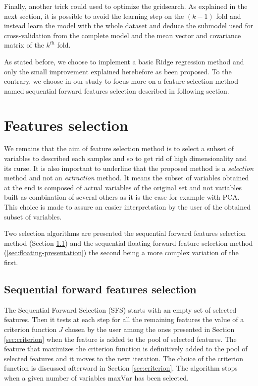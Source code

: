 \documentclass[a4paper,11pt,DIV=16]{scrartcl}
\begin{document}
    Finally, another trick could used to optimize the gridsearch. As explained in the next section, it is possible to avoid the learning step on the $(k-1)$ fold and instead learn the model with the whole dataset and deduce the submodel used for cross-validation from the complete model and the mean vector and covariance matrix of the $k^{th}$ fold.

    As stated before, we choose to implement a basic Ridge regression method and only the small improvement explained herebefore as been proposed. To the contrary, we choose in our study to focus more on a feature selection method named sequential forward features selection described in following section.

\section{Features selection}

We remains that the aim of feature selection method is to select a subset of variables to described each samples and so to get rid of high dimensionality and its curse. It is also important to underline that the proposed method is a \emph{selection} method and not an \emph{extraction} method. It means the subset of variables obtained at the end is composed of actual variables of the original set and not variables built as combination of several others as it is the case for example with PCA. This choice is made to assure an easier interpretation by the user of the obtained subset of variables.

Two selection algorithms are presented the sequential forward features selection method (Section \ref{sec:forward-presentation}) and the sequential floating forward feature selection method (\ref{sec:floating-presentation}) the second being a more complex variation of the first.

    \subsection{Sequential forward features selection}
    \label{sec:forward-presentation}

    The Sequential Forward Selection (SFS) starts with an empty set of selected features. Then it tests at each step for all the remaining features the value of a criterion function $J$ chosen by the user among the ones presented in Section \ref{sec:criterion} when the feature is added to the pool of selected features. The feature that maximizes the criterion function is definitively added to the pool of selected features and it moves to the next iteration. The choice of the criterion function is discussed afterward in Section \ref{sec:criterion}. The algorithm stops when a given number of variables $\text{maxVar}$ has been selected.
\end{document}
